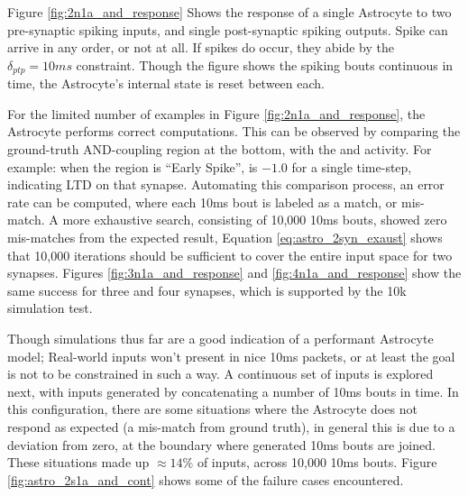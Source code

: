 Figure \ref{fig:2n1a_and_response} Shows the response of a single Astrocyte to
two pre-synaptic spiking inputs, and single post-synaptic spiking outputs. Spike
can arrive in any order, or not at all. If spikes do occur, they abide by the
$\delta_{ptp}=10ms$ constraint. Though the figure shows the spiking bouts
continuous in time, the Astrocyte's internal state is reset between each.


For the limited number of examples in Figure \ref{fig:2n1a_and_response}, the
Astrocyte performs correct computations. This can be observed by comparing the
ground-truth AND-coupling region at the bottom, with the \dser and \serca
activity. For example: when the region is ``Early Spike'', \dser is $-1.0$ for a
single time-step, indicating LTD on that synapse. Automating this comparison
process, an error rate can be computed, where each 10ms bout is labeled as a
match, or mis-match. A more exhaustive search, consisting
of 10,000 10ms bouts, showed zero mis-matches from the expected result, Equation
\ref{eq:astro_2syn_exaust} shows that 10,000 iterations should be sufficient to
cover the entire input space for two synapses. Figures
\ref{fig:3n1a_and_response} and \ref{fig:4n1a_and_response} show the same success
for three and four synapses, which is supported by the 10k simulation test.



Though simulations thus far are a good indication of a performant Astrocyte
model; Real-world inputs won't present in nice 10ms packets, or at least the
goal is not to be constrained in such a way. A continuous set of inputs is
explored next, with inputs generated by concatenating a number of 10ms bouts in
time. In this configuration, there are some situations where the Astrocyte does
not respond as expected (a mis-match from ground truth), in general this is due
to a \ca deviation from zero, at the boundary where generated 10ms bouts are
joined. These situations made up $\approx 14\%$ of inputs, across 10,000 10ms
bouts. Figure \ref{fig:astro_2s1a_and_cont} shows some of the failure cases
encountered.

